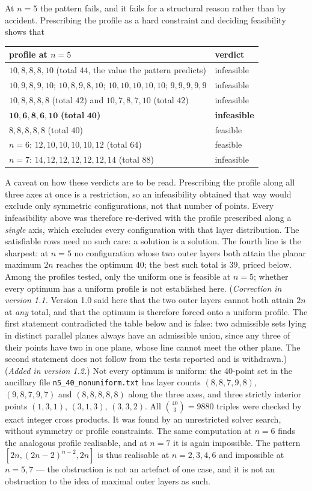 \documentclass[11pt,a4paper]{article}
\begin{document}
At $n=5$ the pattern fails, and it fails for a structural reason rather than by accident.  Prescribing the
profile as a hard constraint and deciding feasibility shows that
\begin{center}\begin{tabular}{ll}\toprule
profile at $n=5$ & verdict\\\midrule
$10,8,8,8,10$ (total $44$, the value the pattern predicts) & infeasible\\
$10,9,8,9,10$; $10,8,9,8,10$; $10,10,10,10,10$; $9,9,9,9,9$ & infeasible\\
$10,8,8,8,8$ (total $42$) and $10,7,8,7,10$ (total $42$) & infeasible\\
$\mathbf{10,6,8,6,10}$ \textbf{(total }$\mathbf{40}$\textbf{)} & \textbf{infeasible}\\
$8,8,8,8,8$ (total $40$) & feasible\\\midrule
$n=6$: $12,10,10,10,10,12$ (total $64$) & feasible\\
$n=7$: $14,12,12,12,12,12,14$ (total $88$) & infeasible\\\bottomrule
\end{tabular}\end{center}
A caveat on how these verdicts are to be read.  Prescribing the profile along all three axes at once is a
restriction, so an infeasibility obtained that way would exclude only symmetric configurations, not that number
of points.  Every infeasibility above was therefore re-derived with the profile prescribed along a
\emph{single} axis, which excludes every configuration with that layer distribution.  The satisfiable rows need
no such care: a solution is a solution.
The fourth line is the sharpest: at $n=5$ no configuration whose two outer layers both attain the planar
maximum $2n$ reaches the optimum $40$; the best such total is $39$, priced below.  Among the profiles tested,
only the uniform one is feasible at $n=5$; whether every optimum has a uniform profile is not established here.
(\emph{Correction in version 1.1.}  Version 1.0 said here that the two outer layers cannot both attain $2n$ at
\emph{any} total, and that the optimum is therefore forced onto a uniform profile.  The first statement
contradicted the table below and is false: two admissible sets lying in distinct parallel planes always have an
admissible union, since any three of their points have two in one plane, whose line cannot meet the other
plane.  The second statement does not follow from the tests reported and is withdrawn.)  (\emph{Added in version 1.2.})  Not every optimum is uniform: the
$40$-point set in the ancillary file \texttt{n5\_40\_nonuniform.txt} has layer counts $(8,8,7,9,8)$,
$(9,8,7,9,7)$ and $(8,8,8,8,8)$ along the three axes, and three strictly interior points $(1,3,1)$, $(3,1,3)$,
$(3,3,2)$.  All $\binom{40}{3}=9880$ triples were checked by exact integer cross products.  It was found by an
unrestricted solver search, without symmetry or profile constraints.  The same computation at $n=6$ finds the
analogous profile realisable, and at $n=7$ it is again impossible.  The pattern $[2n,(2n-2)^{n-2},2n]$ is thus
realisable at $n=2,3,4,6$ and impossible at $n=5,7$ --- the obstruction is not an artefact of one case, and it
is not an obstruction to the idea of maximal outer layers as such.
\end{document}
